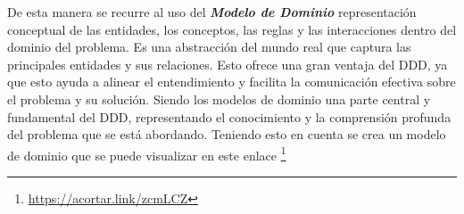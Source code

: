 De esta manera se recurre al uso del \textit{\textbf{Modelo de Dominio}} representación conceptual de las entidades, los conceptos, las reglas y las interacciones dentro del dominio del problema. Es una abstracción del mundo real que captura las principales entidades y sus relaciones. Esto ofrece una gran ventaja del DDD, ya que esto ayuda a alinear el entendimiento y facilita la comunicación efectiva sobre el problema y su solución. Siendo los modelos de dominio una parte central y fundamental del DDD, representando el conocimiento y la comprensión profunda del problema que se está abordando. Teniendo esto en cuenta se crea un modelo de dominio que se puede visualizar en este enlace \footnote{\url{https://acortar.link/zcmLCZ}}